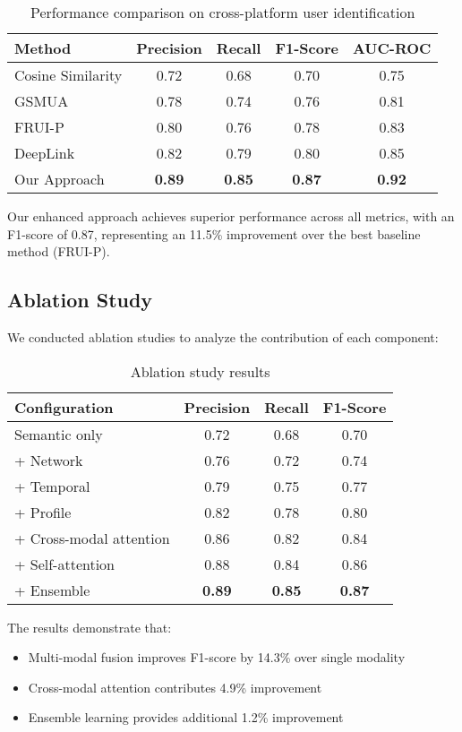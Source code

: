 \documentclass[conference]{IEEEtran}
\begin{document}
\begin{table}[t]
\caption{Performance comparison on cross-platform user identification}
\centering
\small
\begin{tabular}{|l|c|c|c|c|}
\hline
\textbf{Method} & \textbf{Precision} & \textbf{Recall} & \textbf{F1-Score} & \textbf{AUC-ROC} \\
\hline
Cosine Similarity & 0.72 & 0.68 & 0.70 & 0.75 \\
GSMUA & 0.78 & 0.74 & 0.76 & 0.81 \\
FRUI-P & 0.80 & 0.76 & 0.78 & 0.83 \\
DeepLink & 0.82 & 0.79 & 0.80 & 0.85 \\
Our Approach & \textbf{0.89} & \textbf{0.85} & \textbf{0.87} & \textbf{0.92} \\
\hline
\end{tabular}
\label{tab:results}
\end{table}

Our enhanced approach achieves superior performance across all metrics, with an F1-score of 0.87, representing an 11.5\% improvement over the best baseline method (FRUI-P).

\subsection{Ablation Study}
We conducted ablation studies to analyze the contribution of each component:

\begin{table}[t]
\caption{Ablation study results}
\centering
\small
\begin{tabular}{|l|c|c|c|}
\hline
\textbf{Configuration} & \textbf{Precision} & \textbf{Recall} & \textbf{F1-Score} \\
\hline
Semantic only & 0.72 & 0.68 & 0.70 \\
+ Network & 0.76 & 0.72 & 0.74 \\
+ Temporal & 0.79 & 0.75 & 0.77 \\
+ Profile & 0.82 & 0.78 & 0.80 \\
+ Cross-modal attention & 0.86 & 0.82 & 0.84 \\
+ Self-attention & 0.88 & 0.84 & 0.86 \\
+ Ensemble & \textbf{0.89} & \textbf{0.85} & \textbf{0.87} \\
\hline
\end{tabular}
\label{tab:ablation}
\end{table}

The results demonstrate that:
\begin{itemize}
\item Multi-modal fusion improves F1-score by 14.3\% over single modality
\item Cross-modal attention contributes 4.9\% improvement
\item Ensemble learning provides additional 1.2\% improvement
\end{itemize}
\end{document}
